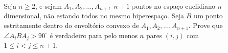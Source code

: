 Seja \(n\ge2\), e sejam \(A_1,A_2,\ldots,A_{n+1}\) \(n+1\) pontos no espaço euclidiano \(n\)-dimensional, não estando todos no mesmo hiperespaço. Seja \(B\) um ponto estritamente dentro do envoltório convexo de \(A_1,A_2,\ldots,A_{n+1}\). Prove que \(\angle A_iBA_j > 90^\circ\) é verdadeiro para pelo menos \(n\) pares \((i,j)\) com \(\displaystyle{1\le i < j\le n+1}\).

